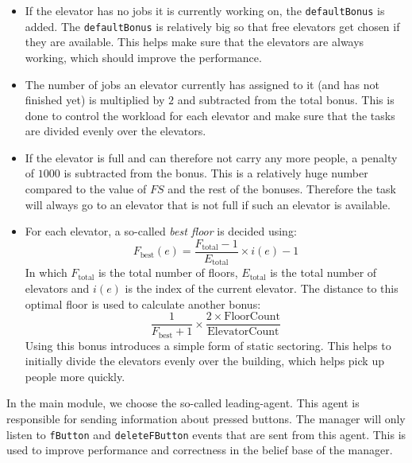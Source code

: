 \documentclass[a4paper,11pt,twocolumn]{article}
\begin{document}
\begin{itemize}
 \item If the elevator has no jobs it is currently working on, the \texttt{defaultBonus} is added. The \texttt{defaultBonus} is relatively big so that free elevators get chosen if they are available. This helps make sure that the elevators are always working, which should improve the performance.
 
 \item The number of jobs an elevator currently has assigned to it (and has not finished yet) is multiplied by $2$ and subtracted from the total bonus. This is done to control the workload for each elevator and make sure that the tasks are divided evenly over the elevators.
 
 \item If the elevator is full and can therefore not carry any more people, a penalty of $1000$ is subtracted from the bonus. This is a relatively huge number compared to the value of $FS$ and the rest of the bonuses. Therefore the task will always go to an elevator that is not full if such an elevator is available.
 
 \item For each elevator, a so-called \emph{best floor} is decided using:
 \begin{equation}
  \label{eq:best_floor}
  F_\text{best} (e) = \frac{F_\text{total} - 1}{E_\text{total}} \times i(e) - 1
 \end{equation}
 In which $F_\text{total}$ is the total number of floors, $E_\text{total}$ is the total number of elevators and $i(e)$ is the index of the current elevator.
 The distance to this optimal floor is used to calculate another bonus:
 \begin{equation}
  \frac{1}{F_\text{best} + 1} \times \frac{2 \times \text{FloorCount}}{\text{ElevatorCount}}
 \end{equation}
 Using this bonus introduces a simple form of static sectoring. This helps to initially divide the elevators evenly over the building, which helps pick up people more quickly.
\end{itemize}

In the main module, we choose the so-called leading-agent. This agent is responsible for sending information about pressed buttons. The manager will only listen to \texttt{fButton} and \texttt{deleteFButton} events that are sent from this agent. This is used to improve performance and correctness in the belief base of the manager. 
\end{document}
